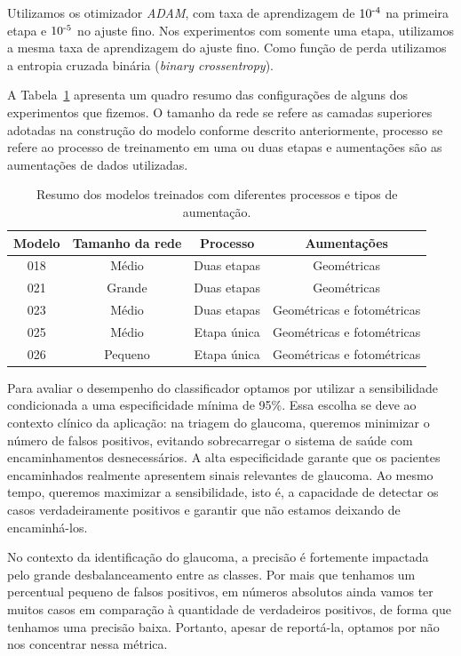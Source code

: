\documentclass[12pt]{article}
\begin{document}
Utilizamos os otimizador \emph{ADAM}, com taxa de aprendizagem de $10\textsuperscript{-4}$ na primeira etapa e $10\textsuperscript{-5}$ no ajuste fino. Nos experimentos com somente uma etapa, utilizamos a mesma taxa de aprendizagem do ajuste fino. Como função de perda utilizamos a entropia cruzada binária (\emph{binary crossentropy}).

A Tabela~\ref{tab:modelos_class_binaria} apresenta um quadro resumo das configurações de alguns dos experimentos que fizemos. O tamanho da rede se refere as camadas superiores adotadas na construção do modelo conforme descrito anteriormente, processo se refere ao processo de treinamento em uma ou duas etapas e aumentações são as aumentações de dados utilizadas.

\begin{table}[h]
\centering
\begin{tabular}{cccc}
\toprule
\textbf{Modelo} & \textbf{Tamanho da rede} & \textbf{Processo} & \textbf{Aumentações} \\ 
\midrule
018 & Médio   & Duas etapas  & Geométricas \\ 
021 & Grande  & Duas etapas  & Geométricas \\ 
023 & Médio   & Duas etapas  & Geométricas e fotométricas \\ 
025 & Médio   & Etapa única  & Geométricas e fotométricas \\ 
026 & Pequeno & Etapa única  & Geométricas e fotométricas \\ 
\bottomrule
\end{tabular}
\caption{Resumo dos modelos treinados com diferentes processos e tipos de aumentação.}
\label{tab:modelos_class_binaria}
\end{table}

Para avaliar o desempenho do classificador optamos por utilizar a sensibilidade condicionada a uma especificidade mínima de 95\%. Essa escolha se deve ao contexto clínico da aplicação: na triagem do glaucoma, queremos minimizar o número de falsos positivos, evitando sobrecarregar o sistema de saúde com encaminhamentos desnecessários. A alta especificidade garante que os pacientes encaminhados realmente apresentem sinais relevantes de glaucoma. Ao mesmo tempo, queremos maximizar a sensibilidade, isto é, a capacidade de detectar os casos verdadeiramente positivos e garantir que não estamos deixando de encaminhá-los.

No contexto da identificação do glaucoma, a precisão é fortemente impactada pelo grande desbalanceamento entre as classes. Por mais que tenhamos um percentual pequeno de falsos positivos, em números absolutos ainda vamos ter muitos casos em comparação à quantidade de verdadeiros positivos, de forma que tenhamos uma precisão baixa. Portanto, apesar de reportá-la, optamos por não nos concentrar nessa métrica.
\end{document}
